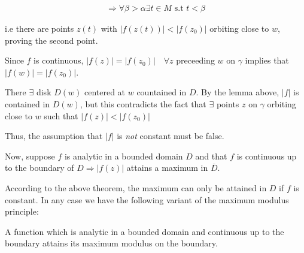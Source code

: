 \begin{prf}[]{}
\begin{itemize}
      \begin{equation*}
        \begin{gathered}
          \Rightarrow\forall \beta>\alpha\exists t\in M\text{ s.t } t<\beta
        \end{gathered}
      \end{equation*}\par
      \noindent i.e there are points $z(t)$ with $\left|f(z(t))\right|<\left|f(z_0)\right|$ orbiting close to $w$, proving the second point.
      \par\bigskip
      \noindent Since $f$ is continuous, $\left|f(z)\right| = \left|f(z_0)\right|\quad\forall z$ preceeding $w$ on $\gamma$ implies that $\left|f(w)\right| = \left|f(z_0)\right|$.\par
      \noindent There $\exists$ disk $D(w)$ centered at $w$ countained in $D$. By the lemma above, $\left|f\right|$ is contained in $D(w)$, but this contradicts the fact that $\exists$  points $z$ on $\gamma$ orbiting close to $w$ such that $\left|f(z)\right|<\left|f(z_0)\right|$
      \par\bigskip
      \noindent Thus, the assumption that $\left|f\right|$ is \textit{not} constant must be false.
  \end{itemize}
\end{prf}
\par\bigskip
\noindent Now, suppose $f$ is analytic in a bounded domain $D$  and that $f$ is continuous up to the boundary of $D\Rightarrow \left|f(z)\right|$ attains a maximum in $\overline{D}$.\par
\noindent According to the  above theorem, the maximum can only be attained in $D$ if $f$ is constant. In any case we have the following variant of the maximum modulus principle:
\par\bigskip
\begin{theo}[]{}
  A function which is analytic in a bounded domain and continuous up to the boundary attains its maximum modulus on the boundary. 
\end{theo}
\par\bigskip
